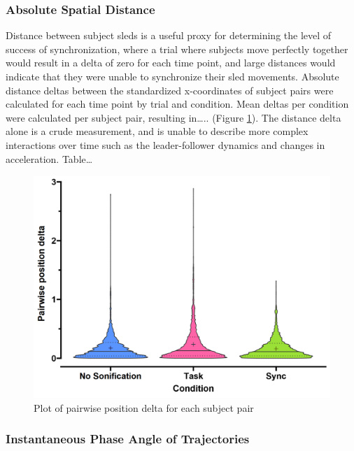 \documentclass[10pt,a4paper,onecolumn]{article}
\begin{document}
\hypertarget{absolute-spatial-distance}{%
\subsubsection{Absolute Spatial Distance}\label{absolute-spatial-distance}}

Distance between subject sleds is a useful proxy for determining the level of success of synchronization, where a trial where subjects move perfectly together would result in a delta of zero for each time point, and large distances would indicate that they were unable to synchronize their sled movements. Absolute distance deltas between the standardized x-coordinates of subject pairs were calculated for each time point by trial and condition. Mean deltas per condition were calculated per subject pair, resulting in\ldots.. (Figure \ref{fig:pairwise-position-delta}). The distance delta alone is a crude measurement, and is unable to describe more complex interactions over time such as the leader-follower dynamics and changes in acceleration.
Table\ldots{}

\begin{figure}[h]

{\centering \includegraphics[width=1\linewidth]{figures/parwise_position_delta} 

}

\caption{Plot of pairwise position delta for each subject pair}\label{fig:pairwise-position-delta}
\end{figure}

\hypertarget{instantaneous-phase-angle-of-trajectories}{%
\subsubsection{Instantaneous Phase Angle of Trajectories}\label{instantaneous-phase-angle-of-trajectories}}
\end{document}
